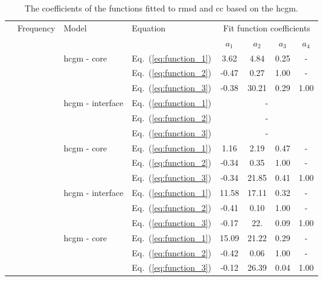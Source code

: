 \begin{table}
	\small
	\tabcolsep=0.2cm
	\centering
	\caption{\label{tab:fit_hcgm_coeff}The coefficients of the functions fitted to \acf{rmsd}  and \acf{cc} based on the \acf{hcgm}.}
	\begin{tabular}{ccllcccc}
		\toprule
		\multirow{2}{*}{\rotatebox[origin=c]{90}{Index}}& \multirow{2}{*}{Frequency} & \multirow{2}{*}{Model} & Equation & \multicolumn{4}{c}{Fit function coefficients}\\
		& & & & \(a_1\) & \(a_2\) & \(a_3\) & \(a_4\)\\
		\midrule
		\multirow{12}{*}{\rotatebox[origin=c]{90}{\ac{rmsd}}} & \multirow{6}{*}{\rotatebox[origin=c]{90}{50 \unit{\kHz}}} & \multirow{3}{*}{\ac{hcgm} - core} & Eq.~(\ref{eq:function_1}) & 3.62 & 4.84 & 0.25 &-\\
		& & & Eq.~(\ref{eq:function_2}) & -0.47 & 0.27 & 1.00 & -\\
		& & & Eq.~(\ref{eq:function_3}) & -0.38 & 30.21 & 0.29 & 1.00 \\
		\cline{3-8}
		& & \multirow{3}{*}{\ac{hcgm} - interface} & Eq.~(\ref{eq:function_1}) & \multicolumn{4}{c}{-}\\
		& & & Eq.~(\ref{eq:function_2}) & \multicolumn{4}{c}{-} \\
		& & & Eq.~(\ref{eq:function_3}) & \multicolumn{4}{c}{-} \\
		\cline{2-8}
		& \multirow{6}{*}{\rotatebox[origin=c]{90}{100 \unit{\kHz}}} & \multirow{3}{*}{\ac{hcgm} - core} & Eq.~(\ref{eq:function_1}) & 1.16 & 2.19 & 0.47 &-\\
		& & & Eq.~(\ref{eq:function_2}) & -0.34 & 0.35 & 1.00 &- \\
		& & & Eq.~(\ref{eq:function_3}) & -0.34 & 21.85 & 0.41 & 1.00 \\
		\cline{3-8}
		& & \multirow{3}{*}{\ac{hcgm} - interface} & Eq.~(\ref{eq:function_1}) & 11.58 & 17.11 & 0.32 & - \\
		& & & Eq.~(\ref{eq:function_2}) & -0.41 & 0.10 & 1.00 & -\\
		& & & Eq.~(\ref{eq:function_3}) & -0.17 & 22. & 0.09 & 1.00 \\
		\midrule
		\multirow{12}{*}{\rotatebox[origin=c]{90}{\ac{cc}}} & \multirow{6}{*}{\rotatebox[origin=c]{90}{50 \unit{\kHz}}} & \multirow{3}{*}{\ac{hcgm} - core} & Eq.~(\ref{eq:function_1}) & 15.09 & 21.22 & 0.29 &-\\
		& & & Eq.~(\ref{eq:function_2}) & -0.42 & 0.06 & 1.00 &- \\
		& & & Eq.~(\ref{eq:function_3}) & -0.12 & 26.39 & 0.04 & 1.00 \\

\end{tabular}
\end{table}
